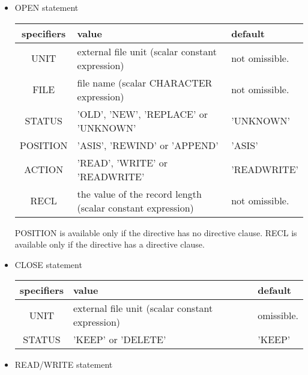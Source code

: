    \begin{itemize}
   \item OPEN statement
   
   \begin{table}[h]
    \begin{center}
     \label{tb:globalopen}
     \begin{tabular}{|c||p{90mm}|l|}
       \hline
      specifiers & value & default \\ \hline \hline
      UNIT & external file unit (scalar constant expression)
	  & not omissible. \\ \hline
      FILE & file name (scalar CHARACTER expression)
	  & not omissible. \\ \hline
      STATUS & 'OLD', 'NEW', 'REPLACE' or 'UNKNOWN' & 'UNKNOWN' \\ \hline
      POSITION & 'ASIS', 'REWIND' or 'APPEND' & 'ASIS' \\ \hline
      ACTION & 'READ', 'WRITE' or 'READWRITE' & 'READWRITE' \\ \hline
      RECL & the value of the record length (scalar constant expression)
	  & not omissible. \\ \hline
     \end{tabular}
    \end{center}
   \end{table}

   POSITION is available only if the directive has no directive clause.
   RECL is available only if the directive has a directive clause.

   \item CLOSE statement
	  
   \begin{table}[h]
    \begin{center}
     \label{tb:globalopen}
     \begin{tabular}{|c||p{90mm}|l|}
        \hline
      specifiers & value & default \\ \hline \hline
      UNIT & external file unit (scalar constant expression)
	  & omissible. \\ \hline
      STATUS & 'KEEP' or 'DELETE'
	  & 'KEEP' \\ \hline
     \end{tabular}
    \end{center}
   \end{table}

    \item READ/WRITE statement
	  

\end{itemize}
